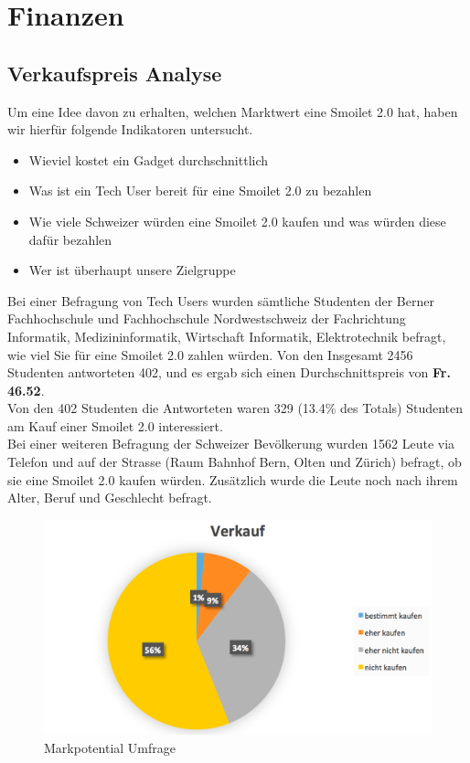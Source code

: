 \chapter{Finanzen}
\label{chap:finanzen}

\section{Verkaufspreis Analyse}
Um eine Idee davon zu erhalten, welchen Marktwert eine Smoilet 2.0 hat, haben wir hierf\"ur folgende Indikatoren untersucht.

\begin{itemize}
\item Wieviel kostet ein Gadget durchschnittlich
\item Was ist ein Tech User bereit f\"ur eine Smoilet 2.0 zu bezahlen 
\item Wie viele Schweizer w\"urden eine Smoilet 2.0 kaufen und was w\"urden diese daf\"ur bezahlen
\item Wer ist \"uberhaupt unsere Zielgruppe 
\end{itemize}

Bei einer Befragung von Tech Users wurden s\"amtliche Studenten der Berner Fachhochschule und Fachhochschule Nordwestschweiz der Fachrichtung Informatik, Medizininformatik, Wirtschaft Informatik, Elektrotechnik befragt, wie viel Sie f\"ur eine Smoilet 2.0 zahlen w\"urden. Von den Insgesamt 2456 Studenten antworteten 402, und es ergab sich einen Durchschnittspreis von \textbf{Fr. 46.52}. \\
Von den 402 Studenten die Antworteten waren 329 (13.4\% des Totals) Studenten am Kauf einer Smoilet 2.0 interessiert.\\
Bei einer weiteren Befragung der Schweizer Bev\"olkerung wurden 1562 Leute via Telefon und auf der Strasse (Raum Bahnhof Bern, Olten und Z\"urich) befragt, ob sie eine Smoilet 2.0 kaufen w\"urden. Zus\"atzlich wurde die Leute noch nach ihrem Alter, Beruf und Geschlecht befragt.

\begin{figure}[H]
\centering
		\includegraphics[scale=0.3]{bilder/marktpot.png}
\caption{Markpotential Umfrage}
\label{fig:marktpot}
\end{figure}

